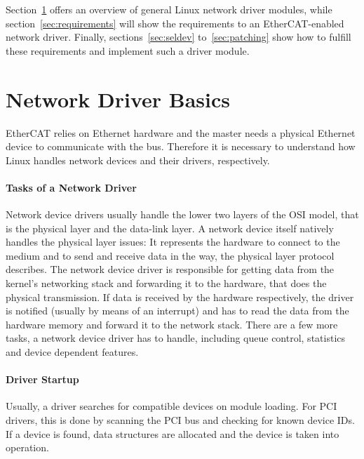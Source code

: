 \documentclass[a4paper,12pt,BCOR6mm,bibtotoc,idxtotoc]{scrbook}
\begin{document}
Section~\ref{sec:networkdrivers} offers an overview of general Linux
network driver modules, while section~\ref{sec:requirements} will show
the requirements to an EtherCAT-enabled network driver. Finally,
sections~\ref{sec:seldev} to~\ref{sec:patching} show how to fulfill
these requirements and implement such a driver module.


\section{Network Driver Basics}
\label{sec:networkdrivers}

EtherCAT relies on Ethernet hardware and the master needs a physical
Ethernet device to communicate with the bus. Therefore it is necessary
to understand how Linux handles network devices and their drivers,
respectively.

\paragraph{Tasks of a Network Driver}

Network device drivers usually handle the lower two layers of the OSI model,
that is the physical layer and the data-link layer. A network device itself
natively handles the physical layer issues: It represents the hardware to
connect to the medium and to send and receive data in the way, the physical
layer protocol describes. The network device driver is responsible for getting
data from the kernel's networking stack and forwarding it to the hardware,
that does the physical transmission.  If data is received by the hardware
respectively, the driver is notified (usually by means of an interrupt) and
has to read the data from the hardware memory and forward it to the network
stack. There are a few more tasks, a network device driver has to handle,
including queue control, statistics and device dependent features.

\paragraph{Driver Startup}

Usually, a driver searches for compatible devices on module loading.
For PCI drivers, this is done by scanning the PCI bus and checking for
known device IDs. If a device is found, data structures are allocated
and the device is taken into operation.
\end{document}

